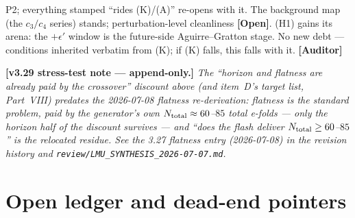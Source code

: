 \documentclass[11pt]{article}
\newcommand{\Auditor}{\textbf{\textcolor{teal!55!black}{[Auditor]}}}
\newcommand{\open}{\textcolor{red!70!black}{\textbf{[Open]}}}
\begin{document}
P2; everything stamped ``rides (K)/(A)'' re-opens with it. The background map (the $c_3/c_4$ series) stands; perturbation-level cleanliness \open. (H1) gains its arena: the $+\epsilon'$ window is the future-side Aguirre--Gratton stage. No new debt --- conditions inherited verbatim from (K); if (K) falls, this falls with it. \Auditor

\medskip\noindent\textbf{[v3.29 stress-test note --- append-only.]} \emph{The ``horizon and flatness are already paid by the crossover'' discount above (and item~D's target list, Part~VIII) predates the 2026-07-08 flatness re-derivation: flatness is the standard problem, paid by the \emph{generator's own} $N_{\rm total}\approx60$--$85$ total e-folds --- only the horizon half of the discount survives --- and ``does the flash deliver $N_{\rm total}\ge60$--$85$'' is the relocated residue. See the 3.27 flatness entry (2026-07-08) in the revision history and \texttt{review/LMU\_SYNTHESIS\_2026-07-07.md}.}

\clearpage
\part{Open ledger and dead-end pointers}
\setcounter{section}{0}\setcounter{equation}{0}\setcounter{figure}{0}

\end{document}
